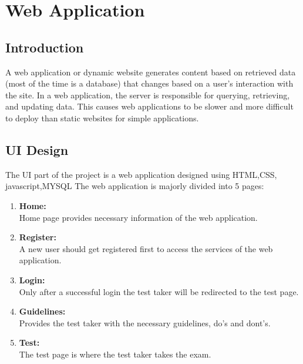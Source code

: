 \documentclass[12pt]{report}
\begin{document}
\section{Web Application}
\subsection{Introduction}
A web application or dynamic website generates content based on retrieved data (most of the time is a database) that changes based on a user’s interaction with the site. In a web application, the server is responsible for querying, retrieving, and updating data. This causes web applications to be slower and more difficult to deploy than static websites for simple applications.\\
\subsection{UI Design}
The UI part of the project is a web application designed using HTML,CSS, javascript,MYSQL The web application is majorly divided into 5 pages:
\begin{enumerate}
\item \textbf{Home:}\\
Home page provides necessary information of the web application.
\item \textbf{Register:}\\
A new user should get registered first to access the services of the web application.
\item \textbf{Login:}\\
Only after a successful login the test taker will be redirected to the test page.
\item \textbf{Guidelines:}\\
Provides the test taker with the necessary guidelines, do’s and dont’s.
\item \textbf{Test:}\\
The test page is  where the test taker takes the exam.
\end{enumerate}
\end{document}
